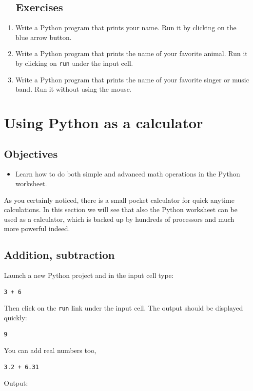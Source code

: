 \subsection{\ \ Exercises}

\begin{enumerate}
\item Write a Python program that prints your name. Run it by clicking on the blue arrow button.
\item Write a Python program that prints the name of your favorite animal. 
      Run it by clicking on {\tt run} under the input cell.
\item Write a Python program that prints the name of your favorite singer 
      or music band. Run it without using the mouse.
\end{enumerate}

\section{Using Python as a calculator}

\subsection{Objectives}

\begin{itemize}
\item Learn how to do both simple and advanced math operations in the Python worksheet.
\end{itemize}
As you certainly noticed, there is a small pocket calculator for quick anytime 
calculations. In this section we will see that also the Python worksheet can be 
used as a calculator, which is backed up by hundreds of processors and much more powerful indeed.

\subsection{Addition, subtraction}

Launch a new Python project and in the input cell type:

\begin{verbatim}
3 + 6
\end{verbatim}
Then click on the {\tt run} link under the input cell. The output should be displayed quickly:

\begin{verbatim}
9
\end{verbatim}
You can add real numbers too,
\begin{verbatim}
3.2 + 6.31
\end{verbatim}
Output:

